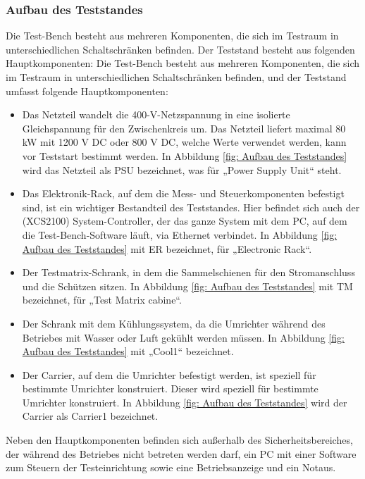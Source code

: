 \subsubsection{Aufbau des Teststandes}
Die Test-Bench besteht aus mehreren Komponenten, die sich im Testraum in unterschiedlichen Schaltschränken befinden.
Der Teststand besteht aus folgenden Hauptkomponenten:
Die Test-Bench besteht aus mehreren Komponenten, die sich im Testraum in unterschiedlichen Schaltschränken befinden, und der Teststand umfasst folgende Hauptkomponenten:
\begin{itemize}

\item Das Netzteil wandelt die 400-V-Netzspannung in eine isolierte Gleichspannung für den Zwischenkreis um.
Das Netzteil liefert maximal 80 kW mit 1200 V DC oder 800 V DC, welche Werte verwendet werden, kann vor Teststart bestimmt werden.
In Abbildung \ref{fig: Aufbau des Teststandes} wird das Netzteil als PSU bezeichnet, was für „Power Supply Unit“ steht.
\item Das Elektronik-Rack, auf dem die Mess- und Steuerkomponenten befestigt sind, ist ein wichtiger Bestandteil des Teststandes.
Hier befindet sich auch der (XCS2100) System-Controller, der das ganze System mit dem PC, auf dem die Test-Bench-Software läuft, via Ethernet verbindet.
In Abbildung \ref{fig: Aufbau des Teststandes} mit ER bezeichnet, für „Electronic Rack“.
\item Der Testmatrix-Schrank, in dem die Sammelschienen für den Stromanschluss und die Schützen sitzen.
In Abbildung \ref{fig: Aufbau des Teststandes} mit TM bezeichnet, für „Test Matrix cabine“.
\item Der Schrank mit dem Kühlungssystem, da die Umrichter während des Betriebes mit Wasser oder Luft gekühlt werden müssen.
In Abbildung \ref{fig: Aufbau des Teststandes} mit „Cool1“ bezeichnet.
\item Der Carrier, auf dem die Umrichter befestigt werden, ist speziell für bestimmte Umrichter konstruiert.
Dieser wird speziell für bestimmte Umrichter konstruiert.
In Abbildung \ref{fig: Aufbau des Teststandes} wird der Carrier als Carrier1 bezeichnet.

\end{itemize}

Neben den Hauptkomponenten befinden sich außerhalb des Sicherheitsbereiches, der während des Betriebes nicht betreten werden darf,
ein PC mit einer Software zum Steuern der Testeinrichtung sowie eine Betriebsanzeige und ein Notaus. \cite*{Main_Manuel_USTB2018}

